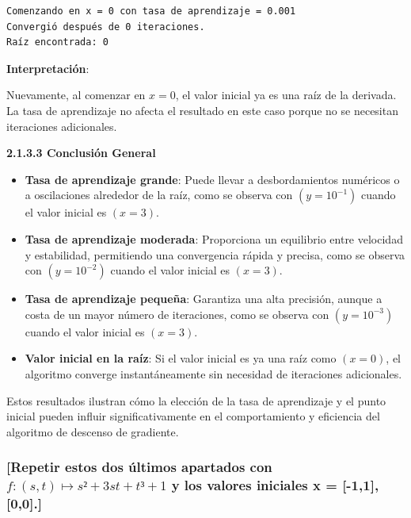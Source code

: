 \documentclass[11pt]{article}
\providecommand{\tightlist}{%
      \setlength{\itemsep}{0pt}\setlength{\parskip}{0pt}}
\begin{document}
    \begin{Verbatim}[commandchars=\\\{\}]
Comenzando en x = 0 con tasa de aprendizaje = 0.001
Convergió después de 0 iteraciones.
Raíz encontrada: 0

    \end{Verbatim}

    \textbf{Interpretación}:

Nuevamente, al comenzar en \(x = 0\), el valor inicial ya es una raíz de
la derivada. La tasa de aprendizaje no afecta el resultado en este caso
porque no se necesitan iteraciones adicionales.

    \textbf{2.1.3.3 Conclusión General}

\begin{itemize}
\tightlist
\item
  \textbf{Tasa de aprendizaje grande}: Puede llevar a desbordamientos
  numéricos o a oscilaciones alrededor de la raíz, como se observa con
  \(( y = 10^{-1} )\) cuando el valor inicial es \(( x = 3 )\).
\item
  \textbf{Tasa de aprendizaje moderada}: Proporciona un equilibrio entre
  velocidad y estabilidad, permitiendo una convergencia rápida y
  precisa, como se observa con \(( y = 10^{-2} )\) cuando el valor
  inicial es \(( x = 3 )\).
\item
  \textbf{Tasa de aprendizaje pequeña}: Garantiza una alta precisión,
  aunque a costa de un mayor número de iteraciones, como se observa con
  \(( y = 10^{-3} )\) cuando el valor inicial es \(( x = 3 )\).
\item
  \textbf{Valor inicial en la raíz}: Si el valor inicial es ya una raíz
  como \(( x = 0 )\), el algoritmo converge instantáneamente sin
  necesidad de iteraciones adicionales.
\end{itemize}

Estos resultados ilustran cómo la elección de la tasa de aprendizaje y
el punto inicial pueden influir significativamente en el comportamiento
y eficiencia del algoritmo de descenso de gradiente.

    \subsubsection{\texorpdfstring{{[}Repetir estos dos últimos apartados
con \(𝑓 : (𝑠, 𝑡) ↦ 𝑠² + 3𝑠𝑡 + 𝑡³ + 1\) y los valores iniciales x =
{[}-1,1{]},
{[}0,0{]}.{]}}{{[}Repetir estos dos últimos apartados con 𝑓 : (𝑠, 𝑡) ↦ 𝑠² + 3𝑠𝑡 + 𝑡³ + 1 y los valores iniciales x = {[}-1,1{]}, {[}0,0{]}.{]}}}\label{repetir-estos-dos-uxfaltimos-apartados-con-ux1d453-ux1d460-ux1d461-ux1d460-3ux1d460ux1d461-ux1d461-1-y-los-valores-iniciales-x--11-00.}
\end{document}
